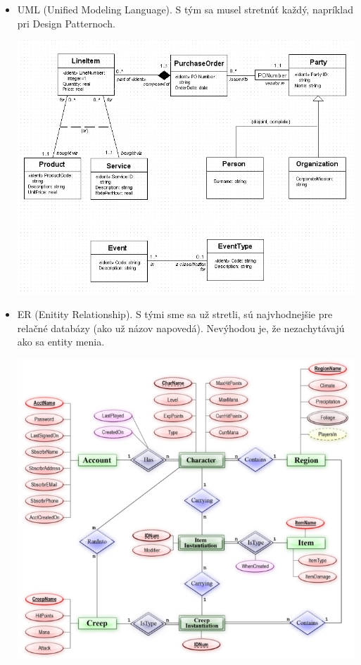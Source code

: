 \documentclass[10pt,a4paper]{article}
\begin{document}
\begin{itemize}
\begin{center}
\end{center}
\item UML (Unified Modeling Language). S tým sa musel stretnúť každý, napríklad pri Design Patternoch.
\begin{center}
\includegraphics[scale=0.5]{db_uml.png}
\end{center}
\item ER (Enitity Relationship). S tými sme sa už stretli, sú najvhodnejšie pre relačné databázy (ako už názov napovedá). Nevýhodou je, že nezachytávajú ako sa entity menia.
\begin{center}
\includegraphics[scale=0.5]{db_entity_relationship.png}
\end{center}
\end{itemize}
\end{document}
